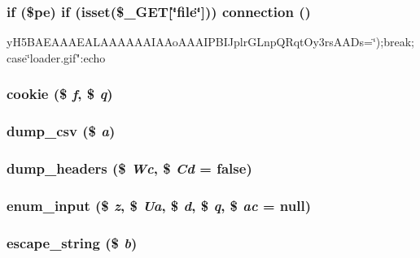 \subsubsection[{connection}]{\setlength{\rightskip}{0pt plus 5cm}if (\$pe) if (isset(\$\_\-GET[\char`\"{}file\char`\"{}])) connection ()}\label{da/d8e/adminer_8php_a3bfab93019b02aa3082e52b69669231f}


yH5BAEAAAEALAAAAAAIAAoAAAIPBIJplrGLnpQRqtOy3rsAADs=\char`\"{});break;case\char`\"{}loader.gif":echo 
\subsubsection[{cookie}]{\setlength{\rightskip}{0pt plus 5cm}cookie (\$ {\em f}, \/  \$ {\em q})}\label{da/d8e/adminer_8php_a1835151bc55ff449aa2177b1de041932}
\subsubsection[{dump\_\-csv}]{\setlength{\rightskip}{0pt plus 5cm}dump\_\-csv (\$ {\em a})}\label{da/d8e/adminer_8php_afca89bf12e6c420579f9291eed21feb9}
\subsubsection[{dump\_\-headers}]{\setlength{\rightskip}{0pt plus 5cm}dump\_\-headers (\$ {\em Wc}, \/  \$ {\em Cd} = {\ttfamily false})}\label{da/d8e/adminer_8php_a086366020e396134a6885ba21e85182d}
\subsubsection[{enum\_\-input}]{\setlength{\rightskip}{0pt plus 5cm}enum\_\-input (\$ {\em z}, \/  \$ {\em Ua}, \/  \$ {\em d}, \/  \$ {\em q}, \/  \$ {\em ac} = {\ttfamily null})}\label{da/d8e/adminer_8php_ab02bc65ba77f284ab70c5464e33e7060}
\subsubsection[{escape\_\-string}]{\setlength{\rightskip}{0pt plus 5cm}escape\_\-string (\$ {\em b})}\label{da/d8e/adminer_8php_acc81706f2e32a017d7736a29e0ee1f8d}
